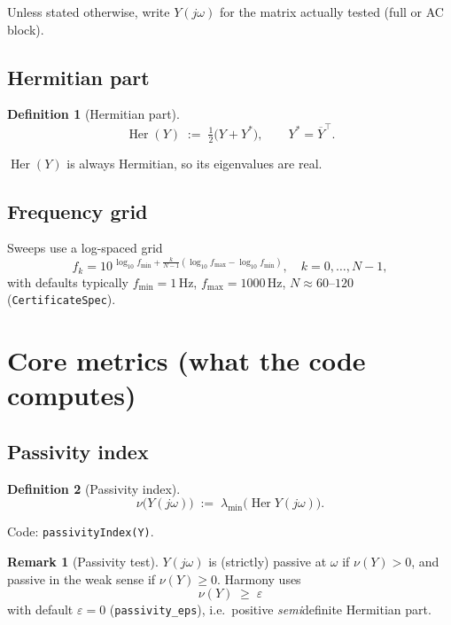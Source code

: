 \documentclass[11pt,a4paper]{article}
\theoremstyle{definition}
\newtheorem{definition}{Definition}
\newtheorem{remark}{Remark}
\begin{document}
Unless stated otherwise, write $Y(j\omega)$ for the matrix actually tested
(full or AC block).

\subsection{Hermitian part}

\begin{definition}[Hermitian part]
\[
  \operatorname{Her}(Y)
  \;:=\;
  \tfrac12\bigl(Y+Y^*\bigr),
  \qquad
  Y^*=\overline{Y}^\top.
\]
\end{definition}
$\operatorname{Her}(Y)$ is always Hermitian, so its eigenvalues are real.

\subsection{Frequency grid}

Sweeps use a log-spaced grid
\begin{equation}
  f_k
  =
  10^{\,\log_{10} f_{\min}
  + \frac{k}{N-1}(\log_{10} f_{\max}-\log_{10} f_{\min})},
  \quad k=0,\ldots,N-1,
\end{equation}
with defaults typically $f_{\min}=1\,\mathrm{Hz}$, $f_{\max}=1000\,\mathrm{Hz}$,
$N\approx 60$--$120$ (\texttt{CertificateSpec}).

\section{Core metrics (what the code computes)}

\subsection{Passivity index}

\begin{definition}[Passivity index]
\[
  \nu\bigl(Y(j\omega)\bigr)
  \;:=\;
  \lambda_{\min}\!\bigl(\operatorname{Her} Y(j\omega)\bigr).
\]
\end{definition}
Code: \texttt{passivityIndex(Y)}.

\begin{remark}[Passivity test]
$Y(j\omega)$ is (strictly) passive at $\omega$ if $\nu(Y)>0$, and
passive in the weak sense if $\nu(Y)\ge 0$. Harmony uses
\[
  \nu(Y)\;\ge\;\varepsilon
\]
with default $\varepsilon=0$ (\texttt{passivity\_eps}), i.e.\ positive
\emph{semi}definite Hermitian part.
\end{remark}
\end{document}
